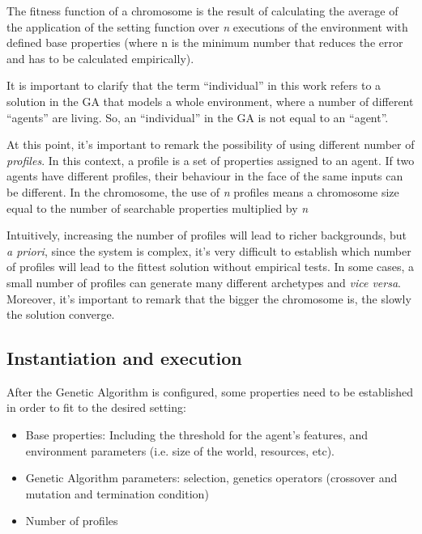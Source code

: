 \documentclass{sig-alternate}
\begin{document}
The fitness function of a chromosome is the result of calculating the average of the application of the setting function over \textit{n} executions of the environment with defined base properties (where n is the minimum number that reduces the error and has to be calculated empirically).

It is important to clarify that the term ``individual'' in this work refers to a solution in the GA that models a whole environment, where a number of different ``agents'' are living. So, an ``individual'' in the GA is not equal to an ``agent''.  %


At this point, it's important to remark the possibility of using different number of {\em profiles}. In this context, a profile is a set of properties assigned to an agent. If two agents have different profiles, their behaviour in the face of the same inputs can be different. In the chromosome, the use of \textit{n} profiles means a chromosome size equal to the number of searchable properties multiplied by \textit{n} 

Intuitively, increasing the number of profiles will lead to richer backgrounds, but \textit{a priori}, since the system is complex, it's very difficult to establish which number of profiles will lead to the fittest solution without empirical tests. In some cases, a small number of profiles can generate many different archetypes and \textit{vice versa}. Moreover, it's important to remark that the bigger the chromosome is, the slowly the solution converge.


\subsection{Instantiation and execution}

After the Genetic Algorithm is configured, some properties need to be established in order to fit to the desired setting:
\begin{itemize}
\item Base properties: Including the threshold for the agent's features, and environment parameters (i.e. size of the world, resources, etc).
\item Genetic Algorithm parameters: selection, genetics operators (crossover and mutation and termination condition)
\item Number of profiles
\end{itemize}
\end{document}
